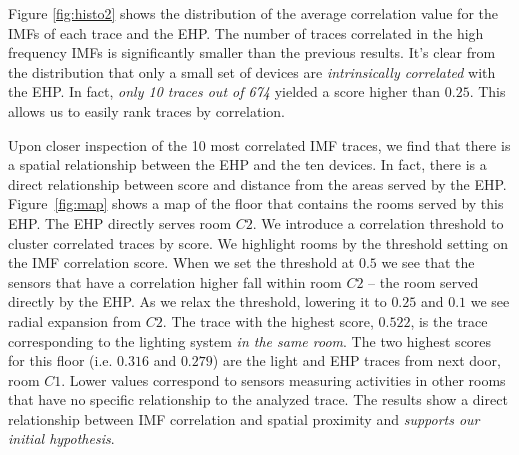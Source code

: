Figure \ref{fig:histo2} shows the distribution of the average correlation value for the IMFs of
each trace and the EHP.  The number of traces correlated in the high frequency IMFs is significantly smaller
than the previous results. It's clear from the distribution that only a small set of devices are
\emph{intrinsically correlated} with the EHP.  In fact, \emph{only 10 traces out of 674} yielded a score higher than 
$0.25$. This allows us to easily rank traces by correlation.

Upon closer inspection of the 10 most correlated IMF traces, we find that there is a spatial relationship
between the EHP and the ten devices.  In fact, there is a direct relationship between score and distance from
the areas served by the EHP.  Figure~\ref{fig:map} shows a map of the floor that contains the rooms served by this
EHP.  The EHP directly serves room $C2$.  We introduce a correlation threshold to cluster correlated traces by score.
We highlight rooms by the threshold setting on the IMF correlation score.
When we set the threshold at $0.5$ we see that the sensors that have a correlation higher fall within room $C2$ --
the room served directly by the EHP.  As we relax the threshold, lowering it to $0.25$ and $0.1$ we see radial expansion from $C2$.  The trace with the highest score, $0.522$, is the trace corresponding to the lighting system \emph{in
the same room}.
The two highest scores for this floor (i.e. $0.316$ and $0.279$) are the light and EHP traces from next door, room $C1$.
Lower values correspond to sensors measuring activities in other rooms that have no specific relationship to the analyzed trace.  The results show a direct relationship between IMF correlation and spatial proximity and \emph{supports our initial
hypothesis}.




